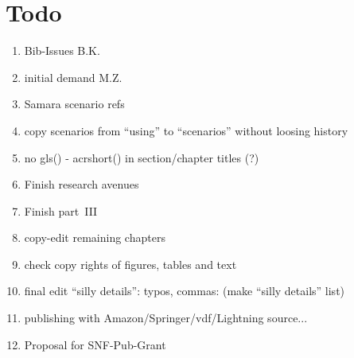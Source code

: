 \section*{Todo}

\begin{enumerate}\styleEnumerate

\item Bib-Issues B.K.

\item initial demand M.Z.

\item Samara scenario refs

\item copy scenarios from ``using'' to ``scenarios'' without loosing history

\item no gls() - acrshort() in section/chapter titles (?)

\item Finish research avenues

\item Finish part~III

\item copy-edit remaining chapters

\item check copy rights of figures, tables and text

\item final edit ``silly details'': typos, commas: (make ``silly details'' list)

\item publishing with Amazon/Springer/vdf/Lightning source...

\item Proposal for SNF-Pub-Grant







\end{enumerate}
